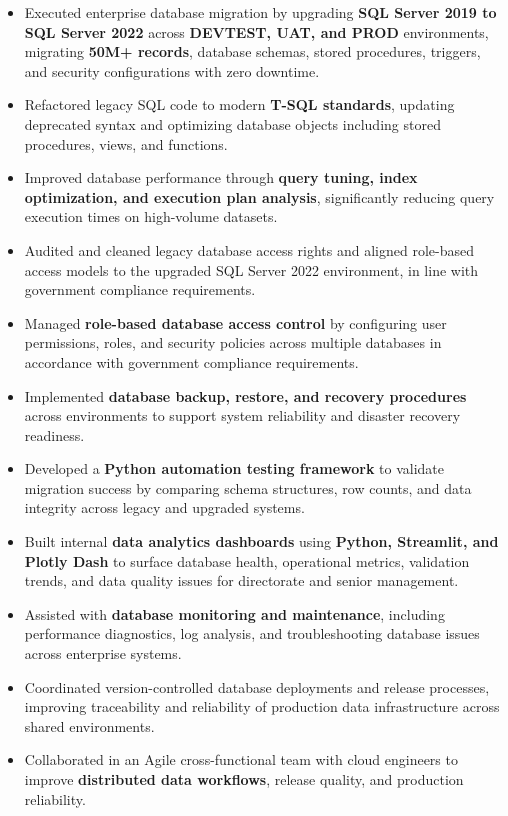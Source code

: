 \documentclass[a4paper]{article}
\begin{document}
\begin{itemize} \itemsep -2pt
\item Executed enterprise database migration by upgrading \textbf{SQL Server 2019 to SQL Server 2022} across \textbf{DEVTEST, UAT, and PROD} environments, migrating \textbf{50M+ records}, database schemas, stored procedures, triggers, and security configurations with zero downtime.
\item Refactored legacy SQL code to modern \textbf{T-SQL standards}, updating deprecated syntax and optimizing database objects including stored procedures, views, and functions.
\item Improved database performance through \textbf{query tuning, index optimization, and execution plan analysis}, significantly reducing query execution times on high-volume datasets.
\item Audited and cleaned legacy database access rights and aligned role-based access models to the upgraded SQL Server 2022 environment, in line with government compliance requirements.
\item Managed \textbf{role-based database access control} by configuring user permissions, roles, and security policies across multiple databases in accordance with government compliance requirements.
\item Implemented \textbf{database backup, restore, and recovery procedures} across environments to support system reliability and disaster recovery readiness.
\item Developed a \textbf{Python automation testing framework} to validate migration success by comparing schema structures, row counts, and data integrity across legacy and upgraded systems.
\item Built internal \textbf{data analytics dashboards} using \textbf{Python, Streamlit, and Plotly Dash} to surface database health, operational metrics, validation trends, and data quality issues for directorate and senior management.
\item Assisted with \textbf{database monitoring and maintenance}, including performance diagnostics, log analysis, and troubleshooting database issues across enterprise systems.
\item Coordinated version-controlled database deployments and release processes, improving traceability and reliability of production data infrastructure across shared environments.
\item Collaborated in an Agile cross-functional team with cloud engineers to improve \textbf{distributed data workflows}, release quality, and production reliability.
\end{itemize}
\end{document}
